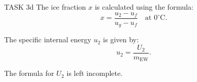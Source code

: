 TASK 3d  
The ice fraction \( x \) is calculated using the formula:  
\[
x = \frac{u_2 - u_f}{u_g - u_f} \quad \text{at } 0^\circ\text{C}.
\]  

The specific internal energy \( u_2 \) is given by:  
\[
u_2 = \frac{U_2}{m_{\text{EW}}}.
\]  

The formula for \( U_2 \) is left incomplete.
